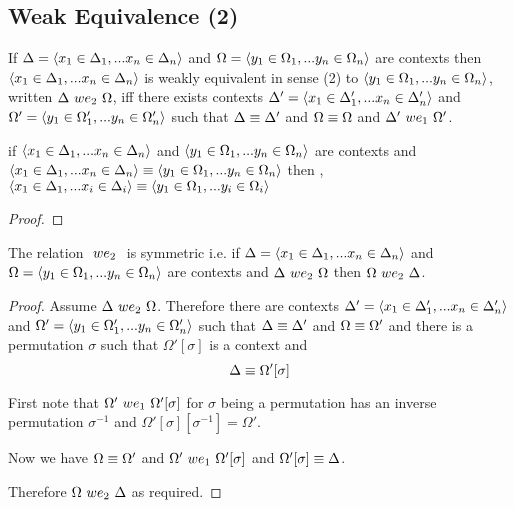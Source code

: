 \documentclass[10pt,a4paper]{scrartcl}
\begin{document}
\subsection{Weak Equivalence (2)}
\begin{definition}
If $\Delta=\langle x_1 \in \Delta_1,... x_{n} \in \Delta_{n}\rangle$ and $\Omega = \langle y_1 \in \Omega_1,... y_{n} \in \Omega_{n}\rangle$ are contexts then $\langle x_1 \in \Delta_1,... x_{n} \in \Delta_{n}\rangle$ is weakly equivalent in sense (2) to $\langle y_1 \in \Omega_1,... y_{n} \in \Omega_{n}\rangle$, written $\Delta\ we_2\ \Omega$, iff there exists contexts $\Delta' = \langle x_1 \in \Delta'_1,... x_{n} \in \Delta'_{n}\rangle$ and $\Omega' = \langle y_1 \in \Omega'_1,... y_{n} \in \Omega'_{n}\rangle$ such that
$\Delta \equiv \Delta'$ and $\Omega \equiv \Omega$ and $\Delta'\ we_1\ \Omega'$.
\end{definition}

\begin{lemma}
if $\langle x_1 \in \Delta_1,... x_{n} \in \Delta_{n}\rangle$ 
and $\langle y_1 \in \Omega_1,... y_{n} \in \Omega_{n}\rangle$ are contexts 
and $\langle x_1 \in \Delta_1,... x_{n} \in \Delta_{n}\rangle \equiv \langle y_1 \in \Omega_1,... y_{n} \in \Omega_{n}\rangle$ 
then \foreachi,  $\langle x_1 \in \Delta_1,... x_{i} \in \Delta_{i}\rangle \equiv \langle y_1 \in \Omega_1,... y_{i} \in \Omega_{i}\rangle$
\end{lemma}
\begin{proof}
\end{proof}


\begin{lemma}
The relation $\ we_2\ $ is 
symmetric i.e. if $\Delta=\langle x_1 \in \Delta_1,... x_{n} \in \Delta_{n}\rangle$ 
and $\Omega = \langle y_1 \in \Omega_1,... y_{n} \in \Omega_{n}\rangle$ are contexts 
and $\Delta\ we_2\ \Omega$ 
then $\Omega\ we_2\ \Delta$.
\end{lemma}
\begin{proof}
Assume $\Delta\ we_2\ \Omega$. Therefore there are contexts $\Delta'=\langle x_1 \in \Delta'_1,... x_{n} \in \Delta'_{n}\rangle$ and $\Omega' = \langle y_1 \in \Omega'_1,... y_{n} \in \Omega'_{n}\rangle$  such that $\Delta \equiv \Delta'$ and $\Omega \equiv \Omega'$ and there is a permutation $\sigma$ such that $\Omega'[\sigma]$  is a context and 
\begin{equation}
\Delta \equiv \Omega'[\sigma]
\end{equation}

First note that $\Omega'\ we_1\ \Omega'[\sigma]$ for $\sigma$ being a  permutation has an inverse permutation $\sigma^{-1}$ and  $\Omega'[\sigma][\sigma^{-1}]=\Omega'$.

Now we have $\Omega \equiv \Omega'$ and $\Omega'\ we_1\ \Omega'[\sigma]$ and $ \Omega'[\sigma] \equiv  \Delta$.

Therefore $\Omega\ we_2\ \Delta$ as required.
\end{proof}
\end{document}
